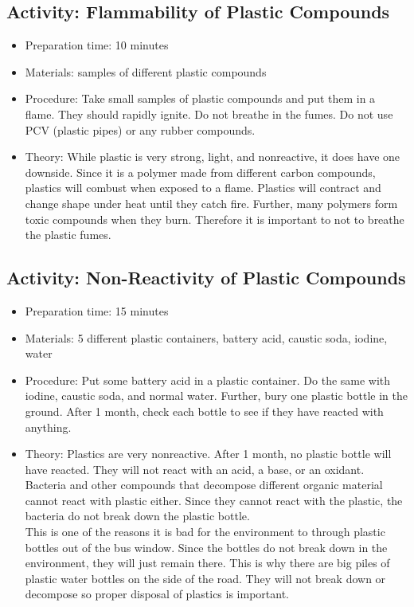 \begin{itemize}
{\begin{itemize}
\begin{itemize}
{\subsection{Activity: Flammability of Plastic Compounds}
\begin{itemize}
\item{Preparation time: 10 minutes}
\item{Materials: samples of different plastic compounds}
\item{Procedure: Take small samples of plastic compounds and put them in a flame. They should rapidly ignite. Do not breathe in the fumes. Do not use PCV (plastic pipes) or any rubber compounds.}
\item{Theory: While plastic is very strong, light, and nonreactive, it does have one downside. Since it is a polymer made from different carbon compounds, plastics will combust when exposed to a flame. Plastics will contract and change shape under heat until they catch fire. Further, many polymers form toxic compounds when they burn. Therefore it is important to not to breathe the plastic fumes.}
\end{itemize}

\subsection{Activity: Non-Reactivity of Plastic Compounds}
\begin{itemize}
\item{Preparation time: 15 minutes}
\item{Materials: 5 different plastic containers, battery acid, caustic soda, iodine, water}
\item{Procedure: Put some battery acid in a plastic container. Do the same with iodine, caustic soda, and normal water. Further, bury one plastic bottle in the ground. After 1 month, check each bottle to see if they have reacted with anything.}
\item{Theory: Plastics are very nonreactive. After 1 month, no plastic bottle will have reacted. They will not react with an acid, a base, or an oxidant. Bacteria and other compounds that decompose different organic material cannot react with plastic either. Since they cannot react with the plastic, the bacteria do not break down the plastic bottle.\\
This is one of the reasons it is bad for the environment to through plastic bottles out of the bus window. Since the bottles do not break down in the environment, they will just remain there. This is why there are big piles of plastic water bottles on the side of the road. They will not break down or decompose so proper disposal of plastics is important.}
\end{itemize}

}
\end{itemize}
\end{itemize}}
\end{itemize}
